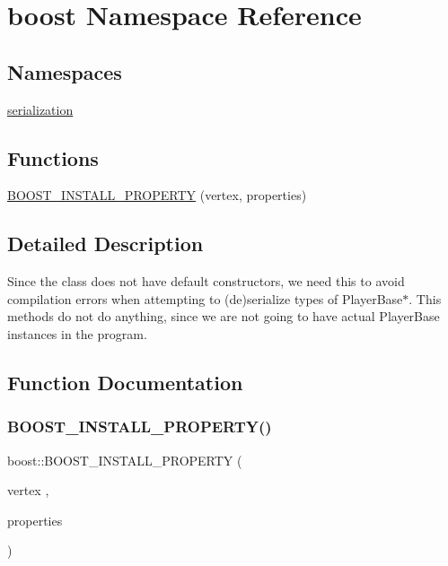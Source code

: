 \hypertarget{namespaceboost}{}\section{boost Namespace Reference}
\label{namespaceboost}
\subsection*{Namespaces}
\begin{DoxyCompactItemize}
\item 
 \hyperlink{namespaceboost_1_1serialization}{serialization}
\end{DoxyCompactItemize}
\subsection*{Functions}
\begin{DoxyCompactItemize}
\item 
\hyperlink{namespaceboost_a598a18075d16f0415fbb0e089e2dab2d}{B\+O\+O\+S\+T\+\_\+\+I\+N\+S\+T\+A\+L\+L\+\_\+\+P\+R\+O\+P\+E\+R\+TY} (vertex, properties)
\end{DoxyCompactItemize}


\subsection{Detailed Description}
Since the class does not have default constructors, we need this to avoid compilation errors when attempting to (de)serialize types of Player\+Base$\ast$. This methods do not do anything, since we are not going to have actual Player\+Base instances in the program. 

\subsection{Function Documentation}
\mbox{\label{namespaceboost_a598a18075d16f0415fbb0e089e2dab2d}} 
\subsubsection{\texorpdfstring{B\+O\+O\+S\+T\+\_\+\+I\+N\+S\+T\+A\+L\+L\+\_\+\+P\+R\+O\+P\+E\+R\+T\+Y()}{BOOST\_INSTALL\_PROPERTY()}}
{\footnotesize\ttfamily boost\+::\+B\+O\+O\+S\+T\+\_\+\+I\+N\+S\+T\+A\+L\+L\+\_\+\+P\+R\+O\+P\+E\+R\+TY (\begin{DoxyParamCaption}\item[{vertex}]{,  }\item[{properties}]{ }\end{DoxyParamCaption})}

